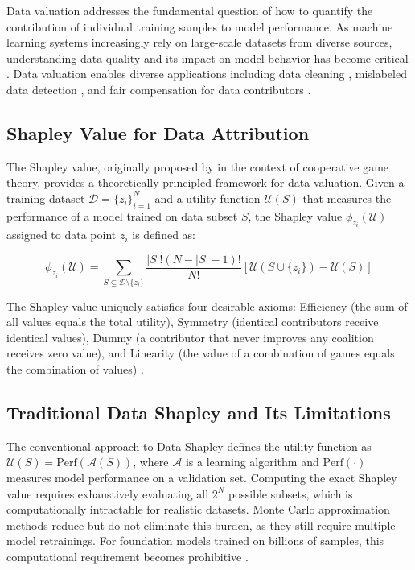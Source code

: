 \documentclass[12pt,a4paper]{report}
\def\dataset{\mathcal{D}}
\def\shapley{\phi}
\def\utility{\mathcal{U}}
\begin{document}
Data valuation addresses the fundamental question of how to quantify the contribution of individual training samples to model performance. As machine learning systems increasingly rely on large-scale datasets from diverse sources, understanding data quality and its impact on model behavior has become critical \citep{ghorbani2019data}. Data valuation enables diverse applications including data cleaning \citep{jia2019efficient}, mislabeled data detection \citep{ghorbani2020distributional}, and fair compensation for data contributors \citep{henderson2023foundation}.

\subsection{Shapley Value for Data Attribution}
\label{sec:shapley_value}

The Shapley value, originally proposed by \citet{shapley1953value} in the context of cooperative game theory, provides a theoretically principled framework for data valuation. Given a training dataset $\dataset = \{z_i\}_{i=1}^N$ and a utility function $\utility(S)$ that measures the performance of a model trained on data subset $S$, the Shapley value $\shapley_{z_i}(\utility)$ assigned to data point $z_i$ is defined as:

\begin{equation}
    \shapley_{z_i}(\utility) = \sum_{S \subseteq \dataset \setminus \{z_i\}} \frac{|S|!(N - |S| - 1)!}{N!} [\utility(S \cup \{z_i\}) - \utility(S)]
    \label{eq:shapley_value}
\end{equation}

The Shapley value uniquely satisfies four desirable axioms: Efficiency (the sum of all values equals the total utility), Symmetry (identical contributors receive identical values), Dummy (a contributor that never improves any coalition receives zero value), and Linearity (the value of a combination of games equals the combination of values) \citep{young1985monotonic}.

\subsection{Traditional Data Shapley and Its Limitations}
\label{sec:traditional_shapley}

The conventional approach to Data Shapley \citep{ghorbani2019data} defines the utility function as $\utility(S) = \text{Perf}(\mathcal{A}(S))$, where $\mathcal{A}$ is a learning algorithm and $\text{Perf}(\cdot)$ measures model performance on a validation set. Computing the exact Shapley value requires exhaustively evaluating all $2^N$ possible subsets, which is computationally intractable for realistic datasets. Monte Carlo approximation methods \citep{ghorbani2019data,jia2019efficient} reduce but do not eliminate this burden, as they still require multiple model retrainings. For foundation models trained on billions of samples, this computational requirement becomes prohibitive \citep{wang2025data}.
\end{document}
